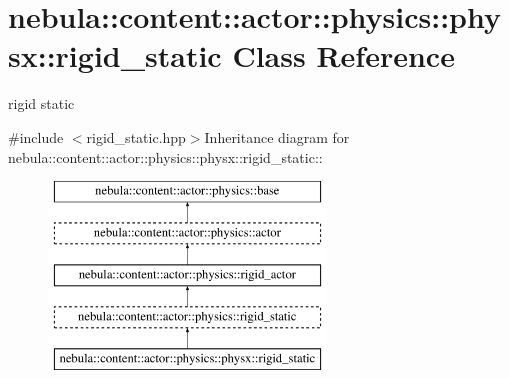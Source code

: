 \hypertarget{classnebula_1_1content_1_1actor_1_1physics_1_1physx_1_1rigid__static}{
\section{nebula::content::actor::physics::physx::rigid\_\-static Class Reference}
\label{classnebula_1_1content_1_1actor_1_1physics_1_1physx_1_1rigid__static}
}


rigid static  


{\ttfamily \#include $<$rigid\_\-static.hpp$>$}Inheritance diagram for nebula::content::actor::physics::physx::rigid\_\-static::\begin{figure}[H]
\begin{center}
\leavevmode
\includegraphics[height=5cm]{classnebula_1_1content_1_1actor_1_1physics_1_1physx_1_1rigid__static}
\end{center}
\end{figure}
